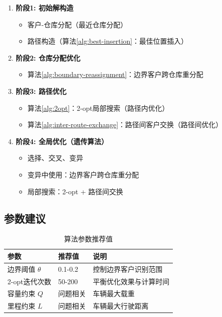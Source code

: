 \documentclass[12pt,a4paper]{article}
\begin{document}
\begin{enumerate}
    \item \textbf{阶段1: 初始解构造}
    \begin{itemize}
        \item 客户-仓库分配（最近仓库分配）
        \item 路径构造（算法\ref{alg:best-insertion}：最佳位置插入）
    \end{itemize}
    
    \item \textbf{阶段2: 仓库分配优化}
    \begin{itemize}
        \item 算法\ref{alg:boundary-reassignment}：边界客户跨仓库重分配
    \end{itemize}
    
    \item \textbf{阶段3: 路径优化}
    \begin{itemize}
        \item 算法\ref{alg:2opt}：2-opt局部搜索（路径内优化）
        \item 算法\ref{alg:inter-route-exchange}：路径间客户交换（路径间优化）
    \end{itemize}
    
    \item \textbf{阶段4: 全局优化（遗传算法）}
    \begin{itemize}
        \item 选择、交叉、变异
        \item 变异中使用：边界客户跨仓库重分配
        \item 局部搜索：2-opt + 路径间交换
    \end{itemize}
\end{enumerate}

\subsection{参数建议}

\begin{table}[h]
\centering
\caption{算法参数推荐值}
\begin{tabular}{|l|l|l|}
\hline
\textbf{参数} & \textbf{推荐值} & \textbf{说明} \\
\hline
边界阈值 $\theta$ & 0.1-0.2 & 控制边界客户识别范围 \\
2-opt迭代次数 & 50-200 & 平衡优化效果与计算时间 \\
容量约束 $Q$ & 问题相关 & 车辆最大载重 \\
里程约束 $L$ & 问题相关 & 车辆最大行驶距离 \\
\hline
\end{tabular}
\end{table}
\end{document}
